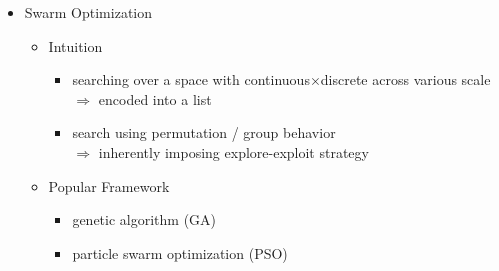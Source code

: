 \begin{itemize}
\item Swarm Optimization
	\begin{itemize}
	\item Intuition
		\begin{itemize}
		\item searching over a space with continuous$\times$discrete across various scale \\ 
		$\Rightarrow$ encoded into a list
		\item search using permutation / group behavior \\ 
		$\Rightarrow$ inherently imposing explore-exploit strategy
		\end{itemize}
	\item Popular Framework
		\begin{itemize}
		\item genetic algorithm (GA)
		\item particle swarm optimization (PSO)
		\end{itemize}
	\end{itemize}
\end{itemize}


